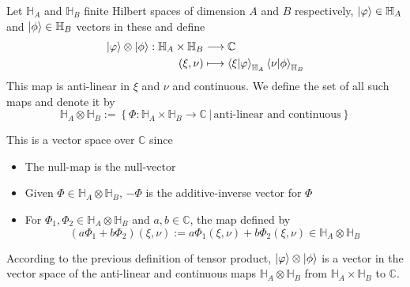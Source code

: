 \begin{definicion}
    Let $\mathbb{H}_A $ and $\mathbb{H}_B$ finite Hilbert spaces of dimension $A$ and $B$ respectively, $\ket{\varphi} \in \mathbb{H}_A$ and $\ket{\phi} \in \mathbb{H}_B$ vectors in these and define
    \begin{align}
        \ket{\varphi} \otimes \ket{\phi} : \mathbb{H}_A \times \mathbb{H}_B &\longrightarrow \mathbb{C} \\
        (\xi, \nu) &\longmapsto \braket{\xi | \varphi}_{\mathbb{H}_A} \braket{\nu | \phi}_{\mathbb{H}_B}
    \end{align}
    This map is anti-linear in $\xi$ and $\nu$ and continuous. We define the set of all such maps and denote it by 
    $$\mathbb{H}_A \otimes \mathbb{H}_B := \left \lbrace \Phi: \mathbb{H}_A \times \mathbb{H}_B \longrightarrow \mathbb{C} \,|\, \text{anti-linear and continuous} \right\rbrace $$

    This is a vector space over $\mathbb{C}$ since 
    \begin{itemize}
        \item The null-map is the null-vector
        
        \item Given $\Phi \in \mathbb{H}_A \otimes \mathbb{H}_B$, $-\Phi$ is the additive-inverse vector for $\Phi$
        
        \item For $\Phi_1, \Phi_2 \in \mathbb{H}_A \otimes \mathbb{H}_B$ and $a, b \in \mathbb{C}$, the map defined by 
        $$\left( a\Phi_1 + b\Phi_2 \right) (\xi, \nu) := a \Phi_1(\xi, \nu) + b\Phi_2(\xi, \nu) \in \mathbb{H}_A \otimes \mathbb{H}_B$$
    \end{itemize}

    According to the previous definition of tensor product, $\ket{\varphi}\otimes \ket{\phi}$ is a vector in the vector space of the anti-linear and continuous maps $\mathbb{H}_A \otimes \mathbb{H}_B$ from $\mathbb{H}_A \times \mathbb{H}_B$ to $\mathbb{C}$. 
\end{definicion}

